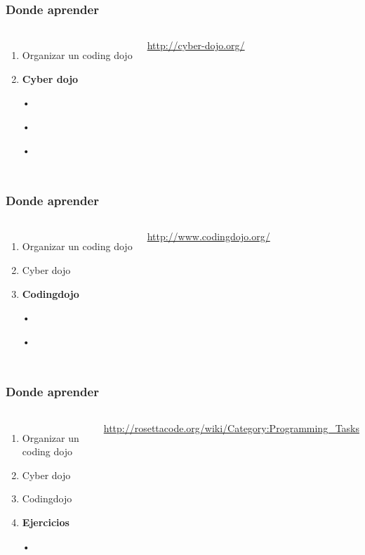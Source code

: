 \documentclass{beamer}
\begin{document}
\begin{frame}
\frametitle{Donde aprender}
\begin{columns}[c] %
\begin{enumerate}
\item Organizar un coding dojo
\item \textbf{Cyber dojo}
\item[•]
\item[•]
\item[•]
\end{enumerate}

{\color{blue}\url{http://cyber-dojo.org/}}
\end{columns}
\end{frame}
\begin{frame}
\frametitle{Donde aprender}
\begin{columns}[c] %
\begin{enumerate}
\item Organizar un coding dojo
\item Cyber dojo
\item \textbf{Codingdojo}
\item[•]
\item[•]
\end{enumerate}

{\color{blue}\url{http://www.codingdojo.org/}}
\end{columns}
\end{frame}
\begin{frame}
\frametitle{Donde aprender}
\begin{columns}[c] %
\begin{enumerate}
\item Organizar un coding dojo
\item Cyber dojo
\item Codingdojo
\item \textbf{Ejercicios}
\item[•]
\end{enumerate}

{\color{blue}\url{http://rosettacode.org/wiki/Category:Programming_Tasks}}
\end{columns}
\end{frame}
\end{document}
